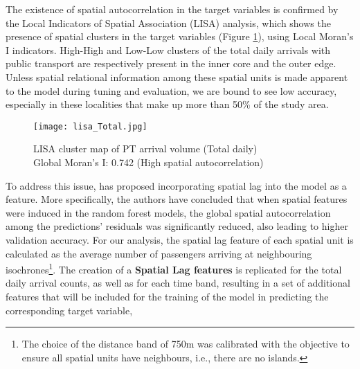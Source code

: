 The existence of spatial autocorrelation in the target variables is confirmed by the Local Indicators of Spatial Association (LISA) analysis, which shows the presence of spatial clusters in the target variables (Figure \ref{fig:lisacluster}), using Local Moran's I indicators. High-High and Low-Low clusters of the total daily arrivals with public transport are respectively present in the inner core and the outer edge. Unless spatial relational information among these spatial units is made apparent to the model during tuning and evaluation, we are bound to see low accuracy, especially in these localities that make up more than 50\% of the study area.  

\begin{figure}[!ht]
    \centering
    \texttt{[image: lisa\_Total.jpg]}
    \captionsetup{justification=centering}
    \caption{LISA cluster map of PT arrival volume (Total daily)\\Global Moran's I: 0.742 (High spatial autocorrelation)}
    \label{fig:lisacluster}
\end{figure}

To address this issue, \citet{liuIncorporatingSpatialAutocorrelation2022} has proposed incorporating spatial lag into the model as a feature. More specifically, the authors have concluded that when spatial features were induced in the random forest models, the global spatial autocorrelation among the predictions' residuals was significantly reduced, also leading to higher validation accuracy. For our analysis, the spatial lag feature of each spatial unit is calculated as the average number of passengers arriving at neighbouring isochrones\footnote{The choice of the distance band of 750m was calibrated with the objective to ensure all spatial units have neighbours, i.e., there are no islands.}. The creation of a \textbf{Spatial Lag features} is replicated for the total daily arrival counts, as well as for each time band, resulting in a set of additional features that will be included for the training of the model in predicting the corresponding target variable,

